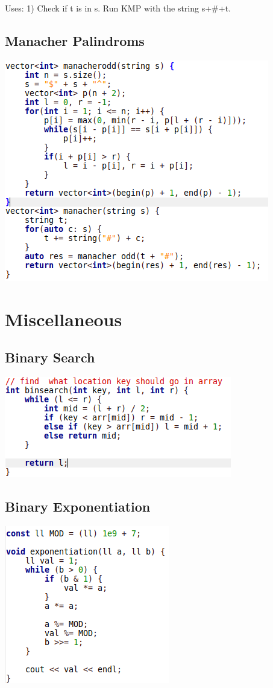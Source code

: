 \documentclass[11pt,twocolumn]{article}
\begin{document}
Uses:
1) Check if t is in s. Run KMP with the string s+\#+t.

\subsection{Manacher Palindroms}
\includegraphics[scale=0.5]{manacher}


\section{Miscellaneous}
\subsection{Binary Search}

\includegraphics[scale=0.5]{binsearch}

\subsection{Binary Exponentiation}

\includegraphics[scale=0.5]{binexp}
\end{document}

